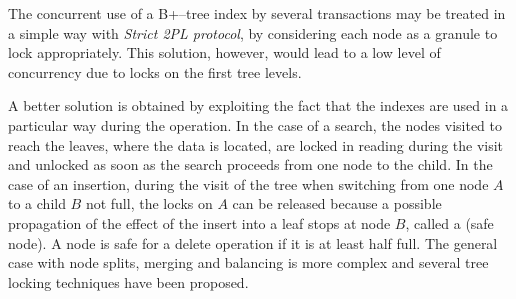 The concurrent use of a B+–tree index by several transactions may be treated in a simple way with \textit{Strict 2PL protocol}, by considering each node as a granule to lock appropriately. This solution, however, would lead to a low level of concurrency due to locks on the first tree levels. 

A better solution is obtained by exploiting the fact that the indexes are used in a particular way during the operation. In the case of a search, the nodes visited to reach the leaves, where the data is located, are locked in reading during the visit and unlocked as soon as the search proceeds from one node to the child. In the case of an insertion, during the visit of the tree when switching from one node $A$ to a child $B$ not full, the locks on $A$ can be released because a possible propagation of the effect of the insert into a leaf stops at node $B$, called a (safe node). A node is safe for a delete operation if it is at least half full. The general case with node splits, merging and balancing is more complex and several tree locking techniques have been proposed. 

